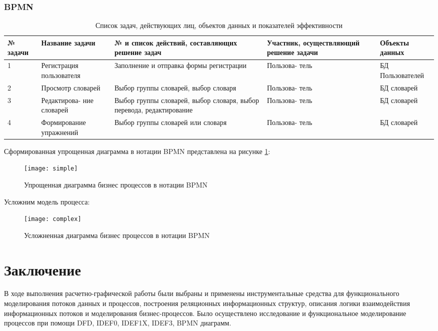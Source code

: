 \documentclass[a4paper,14pt]{extarticle}
\begin{document}
\subsubsection{BPMN}
\begin{table}[H]
    \caption{Список задач, действующих лиц, объектов данных и показателей эффективности}
    \begin{tabular}{| p{2cm} | p{3cm} | p{5cm} | p{2.5cm} | p{2.5cm} |}
        \hline
        № задачи & Название задачи & № и список действий, составляющих решение задач & Участник, осуществляющий решение задачи & Объекты данных \\ \hline
        1 & Регистрация пользователя & Заполнение и отправка формы регистрации & Пользова- тель & БД Пользователей \\ \hline
        2 & Просмотр словарей & Выбор группы словарей, выбор словаря & Пользова- тель & БД словарей \\ \hline
        3 & Редактирова- ние словарей & Выбор группы словарей, выбор словаря, выбор перевода, редактирование & Пользова- тель & БД словарей \\\hline
        4 & Формирование упражнений & Выбор группы словарей или словаря & Пользова- тель & БД словарей \\ \hline
    \end{tabular}
\end{table}

Сформированная упрощенная диаграмма в нотации BPMN представлена на рисунке \ref{fig:simple}:
\begin{figure}[H]
    \centering
    \texttt{[image: simple]}
    \caption{Упрощенная диаграмма бизнес процессов в нотации BPMN}
    \label{fig:simple}
\end{figure}

Усложним модель процесса:
\begin{figure}[H]
    \centering
    \texttt{[image: complex]}
    \caption{Усложненная диаграмма бизнес процессов в нотации BPMN}
    \label{fig:complex}
\end{figure}

\section*{Заключение}
В ходе выполнения расчетно-графической работы были выбраны и применены
инструментальные средства для функционального моделирования потоков данных и
процессов, построения реляционных информационных структур, описания логики
взаимодействия информационных потоков и моделирования бизнес-процессов. Было
осуществлено исследование и функциональное моделирование процессов при помощи
DFD, IDEF0, IDEF1X, IDEF3, BPMN диаграмм.
\end{document}
